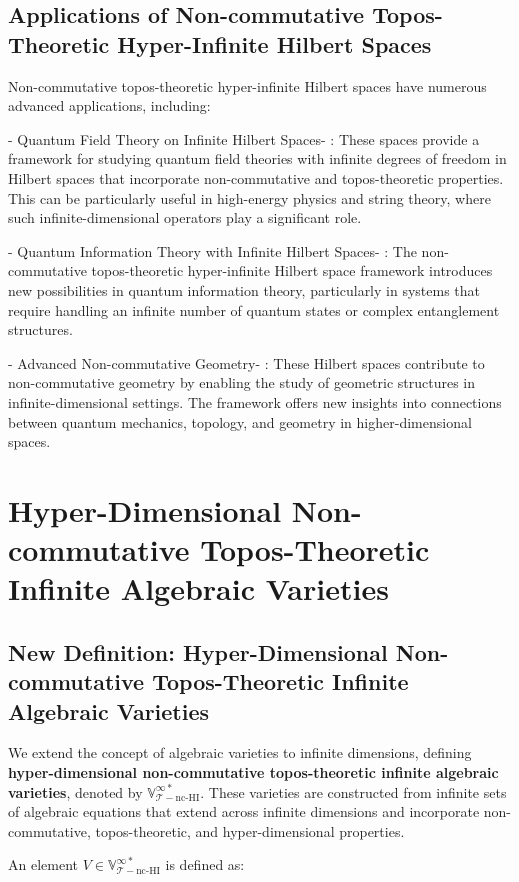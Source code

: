 \documentclass{article}
\begin{document}
\subsection{Applications of Non-commutative Topos-Theoretic Hyper-Infinite Hilbert Spaces}
Non-commutative topos-theoretic hyper-infinite Hilbert spaces have numerous advanced applications, including:

-  Quantum Field Theory on Infinite Hilbert Spaces- : These spaces provide a framework for studying quantum field theories with infinite degrees of freedom in Hilbert spaces that incorporate non-commutative and topos-theoretic properties. This can be particularly useful in high-energy physics and string theory, where such infinite-dimensional operators play a significant role.

-  Quantum Information Theory with Infinite Hilbert Spaces- : The non-commutative topos-theoretic hyper-infinite Hilbert space framework introduces new possibilities in quantum information theory, particularly in systems that require handling an infinite number of quantum states or complex entanglement structures.

-  Advanced Non-commutative Geometry- : These Hilbert spaces contribute to non-commutative geometry by enabling the study of geometric structures in infinite-dimensional settings. The framework offers new insights into connections between quantum mechanics, topology, and geometry in higher-dimensional spaces.

\section{Hyper-Dimensional Non-commutative Topos-Theoretic Infinite Algebraic Varieties}
\subsection{New Definition: Hyper-Dimensional Non-commutative Topos-Theoretic Infinite Algebraic Varieties}
We extend the concept of algebraic varieties to infinite dimensions, defining \textbf{hyper-dimensional non-commutative topos-theoretic infinite algebraic varieties}, denoted by \(\mathbb{V}_{\mathcal{T}-\text{nc-HI}}^{\infty *}\). These varieties are constructed from infinite sets of algebraic equations that extend across infinite dimensions and incorporate non-commutative, topos-theoretic, and hyper-dimensional properties.

An element \(V \in \mathbb{V}_{\mathcal{T}-\text{nc-HI}}^{\infty *}\) is defined as:
\end{document}
